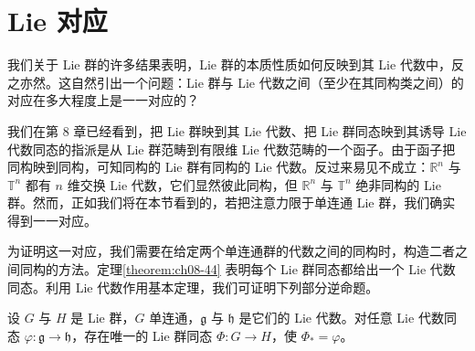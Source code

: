 \documentclass[../../main.tex]{subfiles}
\begin{document}
\section{Lie 对应}\label{section:ch20-lie-correspondence}

我们关于 Lie 群的许多结果表明，Lie 群的本质性质如何反映到其 Lie 代数中，反之亦然。这自然引出一个问题：Lie 群与 Lie 代数之间（至少在其同构类之间）的对应在多大程度上是一一对应的？

我们在第 8 章已经看到，把 Lie 群映到其 Lie 代数、把 Lie 群同态映到其诱导 Lie 代数同态的指派是从 Lie 群范畴到有限维 Lie 代数范畴的一个函子。由于函子把同构映到同构，可知同构的 Lie 群有同构的 Lie 代数。反过来易见不成立：$\mathbb{R}^n$ 与 $\mathbb{T}^n$ 都有 $n$ 维交换 Lie 代数，它们显然彼此同构，但 $\mathbb{R}^n$ 与 $\mathbb{T}^n$ 绝非同构的 Lie 群。然而，正如我们将在本节看到的，若把注意力限于单连通 Lie 群，我们确实得到一一对应。

为证明这一对应，我们需要在给定两个单连通群的代数之间的同构时，构造二者之间同构的方法。定理\cref{theorem:ch08-44} 表明每个 Lie 群同态都给出一个 Lie 代数同态。利用 Lie 代数作用基本定理，我们可证明下列部分逆命题。

\begin{theorem}\label{theorem:ch20-同态提升}
设 $G$ 与 $H$ 是 Lie 群，$G$ 单连通，$\mathfrak g$ 与 $\mathfrak h$ 是它们的 Lie 代数。对任意 Lie 代数同态 $\varphi\colon\mathfrak g\to\mathfrak h$，存在唯一的 Lie 群同态 $\Phi\colon G\to H$，使 $\Phi_*=\varphi$。
\end{theorem}
\end{document}

